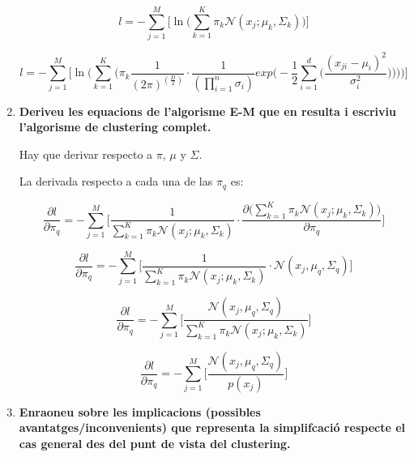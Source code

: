 \documentclass[a5paper]{article}
\begin{document}
\begin{enumerate}
\begin{equation*}
l = -\sum_{j = 1}^{M} \Bigg[ 
\ln\Big(
\sum_{k = 1}^{K} \pi_k \mathcal{N}(x_j; \mu_k, \Sigma_k)
\Big)
\Bigg] 
\end{equation*}


\begin{equation*}
l = -\sum_{j = 1}^{M} \Bigg[ 
\ln\Big(
\sum_{k = 1}^{K}
\big(
    \pi_k \frac{1}{(2\pi)^{(\frac{D}{2})}} \cdot \frac{1}{(\prod_{i = 1}^n \sigma_i)} exp\Bigg( -\frac{1}{2} \sum_{i = 1}^{d} \Big( \frac{(x_{ji} - \mu_i)^2}{\sigma_i^2} \Big) \Bigg)
\big)
\Big)
\Bigg] 
\end{equation*}

\item \textbf{Deriveu les equacions de l'algorisme E-M que en resulta i escriviu l'algorisme de clustering complet.
}

Hay que derivar respecto a $\pi$, $\mu$ y $\Sigma$.

La derivada respecto a cada una de las $\pi_q$ es:

\begin{equation*}
\frac{\partial l}{\partial \pi_q} = 
-\sum_{j = 1}^{M} \Bigg[ 
\frac{1}{
\sum_{k = 1}^{K} \pi_k \mathcal{N}(x_j; \mu_k, \Sigma_k)
}
\cdot \frac{\partial \Big( 
\sum_{k = 1}^{K} \pi_k \mathcal{N}(x_j; \mu_k, \Sigma_k)
\Big)}{\partial \pi_q}
\Bigg] 
\end{equation*}

\begin{equation*}
\frac{\partial l}{\partial \pi_q} = 
-\sum_{j = 1}^{M} \Bigg[ 
\frac{1}{
\sum_{k = 1}^{K} \pi_k \mathcal{N}(x_j; \mu_k, \Sigma_k)
}
\cdot \mathcal{N}(x_j, \mu_q, \Sigma_q)
\Bigg] 
\end{equation*}


\begin{equation*}
\frac{\partial l}{\partial \pi_q} = 
-\sum_{j = 1}^{M} \Bigg[ 
\frac
{\mathcal{N}(x_j, \mu_q, \Sigma_q)}
{
\sum_{k = 1}^{K} \pi_k \mathcal{N}(x_j; \mu_k, \Sigma_k)
}
\Bigg] 
\end{equation*}

\begin{equation*}
\frac{\partial l}{\partial \pi_q} = 
-\sum_{j = 1}^{M} \Bigg[ 
\frac
{\mathcal{N}(x_j, \mu_q, \Sigma_q)}
{
p(x_j)
}
\Bigg] 
\end{equation*}



\item \textbf{Enraoneu sobre les implicacions (possibles avantatges/inconvenients) que representa la simplifcació
respecte el cas general des del punt de vista del clustering.
}
\end{enumerate}
\end{document}
